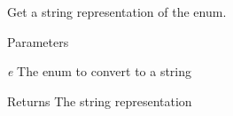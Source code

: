 Get a string representation of the enum. 


\begin{DoxyParams}{Parameters}
\item[{\em e}]The enum to convert to a string \end{DoxyParams}
\begin{DoxyReturn}{Returns}
The string representation 
\end{DoxyReturn}
